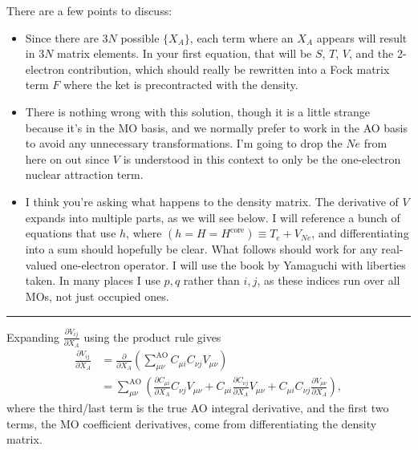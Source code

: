 \documentclass[%
class = book,%
crop = false,%
float = true,%
multi = true,%
preview = false,%
]{standalone}
\begin{document}
There are a few points to discuss:

\begin{itemize}
\item Since there are \(3N\) possible \(\{X_{A}\}\), each term where an \(X_{A}\) appears will result in \(3N\) matrix elements. In your first equation, that will be \(S\), \(T\), \(V\), and the 2-electron contribution, which should really be rewritten into a Fock matrix term \(F\) where the ket is precontracted with the density.
\item There is nothing wrong with this solution, though it is a little strange because it's in the MO basis, and we normally prefer to work in the AO basis to avoid any unnecessary transformations. I'm going to drop the \(Ne\) from here on out since \(V\) is understood in this context to only be the one-electron nuclear attraction term.
\item I think you're asking what happens to the density matrix. The derivative of \(V\) expands into multiple parts, as we will see below. I will reference a bunch of equations that use \(h\), where \(\left( h = H = H^{\text{core}} \right) \equiv T_{e} + V_{Ne}\), and differentiating into a sum should hopefully be clear. What follows should work for any real-valued one-electron operator. I will use the book by Yamaguchi with liberties taken. In many places I use \(p,q\) rather than \(i,j\), as these indices run over all MOs, not just occupied ones.
\end{itemize}

\begin{center}\rule{0.5\linewidth}{\linethickness}\end{center}

Expanding \(\frac{\partial V_{ij}}{\partial X_{A}}\) using the product rule gives
\begin{align*}
  \frac{\partial V_{ij}}{\partial X_{A}} &= \frac{\partial}{\partial X_{A}} \left( \sum_{\mu\nu}^{\text{AO}} C_{\mu i} C_{\nu j} V_{\mu\nu} \right) \tag{Yamaguchi eq. 3.80} \\
                                         &= \sum_{\mu\nu}^{\text{AO}} \left( \frac{\partial C_{\mu i}}{\partial X_{A}} C_{\nu j} V_{\mu\nu} + C_{\mu i} \frac{\partial C_{\nu j}}{\partial X_{A}} V_{\mu\nu} + C_{\mu i} C_{\nu j} \frac{\partial V_{\mu\nu}}{\partial X_{A}} \right), \label{3.81}\tag{Yamaguchi eq. 3.81}
\end{align*}
where the third/last term is the true AO integral derivative, and the first two terms, the MO coefficient derivatives, come from differentiating the density matrix.
\end{document}
